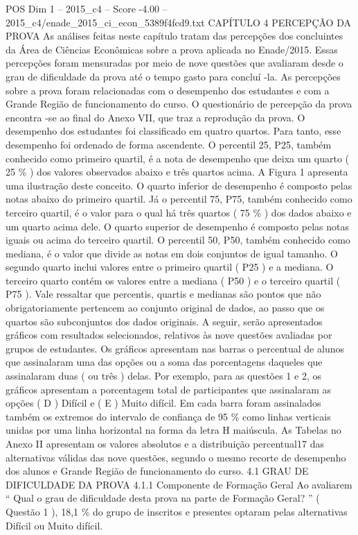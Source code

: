 \begin{textsample}{POS Dim 1 – 2015\_c4 – Score -4.00 – 2015\_c4/enade\_2015\_ci\_econ\_5389f4fcd9.txt}  \label{ex:f1_pos_336}
CAPÍTULO 4 PERCEPÇÃO DA PROVA As análises feitas neste capítulo tratam das percepções dos concluintes da Área de Ciências Econômicas sobre a prova aplicada no Enade/2015.
Essas percepções foram mensuradas por meio de nove questões que avaliaram desde o grau de dificuldade da prova até o tempo gasto para concluí -la.
As percepções sobre a prova foram relacionadas com o desempenho dos estudantes e com a Grande Região de funcionamento do curso.
O questionário de percepção da prova encontra -se ao final do Anexo VII, que traz a reprodução da prova.
O desempenho dos estudantes foi classificado em quatro quartos.
Para tanto, esse desempenho foi ordenado de forma ascendente.
O percentil 25, P25, também conhecido como primeiro quartil, é a nota de desempenho que deixa um quarto ( 25 \% ) dos valores observados abaixo e três quartos acima.
A Figura 1 apresenta uma ilustração deste conceito.
O quarto inferior de desempenho é composto pelas notas abaixo do primeiro quartil.
Já o percentil 75, P75, também conhecido como terceiro quartil, é o valor para o qual há três quartos ( 75 \% ) dos dados abaixo e um quarto acima dele.
O quarto superior de desempenho é composto pelas notas iguais ou acima do terceiro quartil.
O percentil 50, P50, também conhecido como mediana, é o valor que divide as notas em dois conjuntos de igual tamanho.
O segundo quarto inclui valores entre o primeiro quartil ( P25 ) e a mediana.
O terceiro quarto contém os valores entre a mediana ( P50 ) e o terceiro quartil ( P75 ).
Vale ressaltar que percentis, quartis e medianas são pontos que não obrigatoriamente pertencem ao conjunto original de dados, ao passo que os quartos são subconjuntos dos dados originais.
A seguir, serão apresentados gráficos com resultados selecionados, relativos às nove questões avaliadas por grupos de estudantes.
Os gráficos apresentam nas barras o percentual de alunos que assinalaram uma das opções ou a soma das porcentagens daqueles que assinalaram duas ( ou três ) delas.
Por exemplo, para as questões 1 e 2, os gráficos apresentam a porcentagem total de participantes que assinalaram as opções ( D ) Difícil e ( E ) Muito difícil.
Em cada barra foram assinalados também os extremos do intervalo de confiança de 95 \% como linhas verticais unidas por uma linha horizontal na forma da letra H maiúscula.
As Tabelas no Anexo II apresentam os valores absolutos e a distribuição percentual17 das alternativas válidas das nove questões, segundo o mesmo recorte de desempenho dos alunos e Grande Região de funcionamento do curso. 4.1 GRAU DE DIFICULDADE DA PROVA 4.1.1 Componente de Formação Geral Ao avaliarem “ Qual o grau de dificuldade desta prova na parte de Formação Geral? ” ( Questão 1 ), 18,1 \% do grupo de inscritos e presentes optaram pelas alternativas Difícil ou Muito difícil.

\end{textsample}
